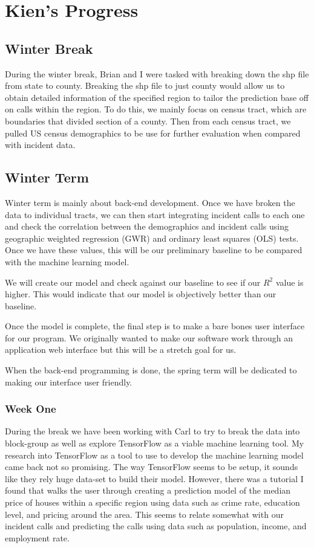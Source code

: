 \documentclass[onecolumn, draftclsnofoot,10pt, compsoc]{IEEEtran}
\begin{document}
\section{Kien's Progress} \label{kien_weekly_summ}
\begin{singlespace}
\subsection{Winter Break} \label{k_winter}
During the winter break, Brian and I were tasked with breaking down the shp file from state to county.
Breaking the shp file to just county would allow us to obtain detailed information of the specified region to tailor the prediction base off on calls within the region.
To do this, we mainly focus on census tract, which are boundaries that divided section of a county. 
Then from each census tract, we pulled US census demographics to be use for further evaluation when compared with incident data.

\subsection{Winter Term} \label{k_wterm}
Winter term is mainly about back-end development.
Once we have broken the data to individual tracts, we can then start integrating incident calls to each one and check the correlation between the demographics and incident calls using geographic weighted regression (GWR) and ordinary least squares (OLS) tests. Once we have these values, this will be our preliminary baseline to be compared with the machine learning model.

We will create our model and check against our baseline to see if our \(R^2\) value is higher. 
This would indicate that our model is objectively better than our baseline.

Once the model is complete, the final step is to make a bare bones user interface for our program.
We originally wanted to make our software work through an application web interface but this will be a stretch goal for us.

When the back-end programming is done, the spring term will be dedicated to making our interface user friendly. 

\subsubsection{Week One} \label{k_w1}
During the break we have been working with Carl to try to break the data into block-group as well as explore TensorFlow as a viable machine learning tool.
My research into TensorFlow as a tool to use to develop the machine learning model came back not so promising.
The way TensorFlow seems to be setup, it sounds like they rely huge data-set to build their model.
However, there was a tutorial I found that walks the user through creating a prediction model of the median price of houses within a specific region using data such as crime rate, education level, and pricing around the area.
This seems to relate somewhat with our incident calls and predicting the calls using data such as population, income, and employment rate.


\end{singlespace}
\end{document}

